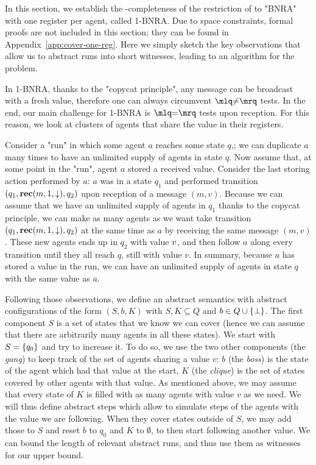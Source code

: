 In this section, we establish the \NP-completeness of the restriction of \COVER to "BNRA" with one register per agent, called 1-BNRA. Due to space constraints, formal proofs are not included in this section; they can be found in Appendix~\ref{app:cover-one-reg}. Here we simply sketch the key observations that allow us to abstract runs into short witnesses, leading to an \NP algorithm for the problem.
	
	In 1-BNRA, thanks to the "copycat principle", any  message can be broadcast with a fresh value, therefore one can always circumvent $\quotemarks{\diseqtestact}$ tests. In the end, our main challenge for 1-BNRA is $\quotemarks{\eqtestact}$ tests upon reception.
	For this reason, we look at clusters of agents that share the value in their registers. 

	Consider a "run" in which some agent $a$ reaches some state $q$,; we can duplicate $a$ many times to have an unlimited supply of agents in state $q$.
	Now assume that, at some point in the "run", agent $a$ stored a received value. Consider the last storing action performed by $a$: $a$ was in a state $q_1$ and performed transition $(q_1, \textbf{rec}(m, 1, \downarrow), q_2)$ upon reception of a message $(m,v)$. 
	Because we can assume that we have an unlimited supply of agents in $q_1$ thanks to the copycat principle, we can make as many agents as we want take transition $(q_1, \textbf{rec}(m, 1, \downarrow), q_2)$ at the same time as $a$ by receiving the same message $(m,v)$. These new agents ends up in $q_2$ with value $v$, and then follow $a$ along every transition until they all reach $q$, still with value $v$. In summary, because $a$ has stored a value in the run, we can have an unlimited supply of agents in state $q$ with the same value as $a$.  
	
	Following those observations, we define an abstract semantics with abstract configurations of the form $(S, b, K)$ with $S, K \subseteq Q$ and $b \in Q \cup \{\bot\}$. The first component $S$ is a set of states that we know we can cover (hence we can assume that there are arbitrarily many agents in all these states).
	We start with $S = \{q_0\}$ and try to increase it. To do so, we use the two other components (the \emph{gang}) to keep track of the set of agents sharing a value $v$: $b$ (the \emph{boss}) is the state of the agent which had that value at the start, $K$ (the \emph{clique}) is the set of states covered by other agents with that value. As mentioned above, we may assume that every state of $K$ is filled with as many agents with value $v$ as we need. 
	We will thus define abstract steps which allow to simulate steps of the agents with the value we are following. When they cover states outside of $S$, we may add those to $S$ and reset $b$ to $q_0$ and $K$  to $\emptyset$, to then start following another value.
	We can bound the length of relevant abstract runs, and thus use them as witnesses for our \NP upper bound.
	
